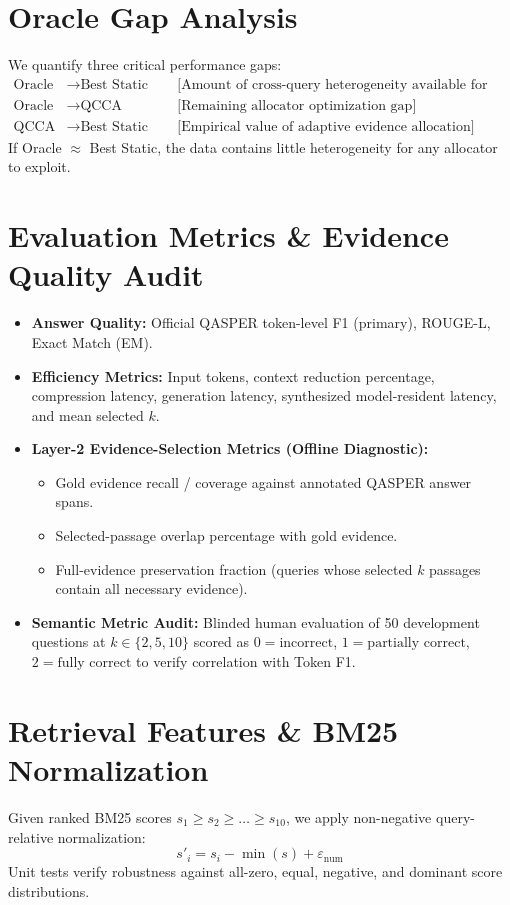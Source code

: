 \documentclass[11pt,a4paper]{article}
\begin{document}
\section{Oracle Gap Analysis}
We quantify three critical performance gaps:
\begin{align*}
\text{Oracle} &\longrightarrow \text{Best Static} \quad &&\text{[Amount of cross-query heterogeneity available for adaptive policies]} \\
\text{Oracle} &\longrightarrow \text{QCCA} \quad &&\text{[Remaining allocator optimization gap]} \\
\text{QCCA} &\longrightarrow \text{Best Static} \quad &&\text{[Empirical value of adaptive evidence allocation]}
\end{align*}
If Oracle $\approx$ Best Static, the data contains little heterogeneity for any allocator to exploit.

\section{Evaluation Metrics \& Evidence Quality Audit}
\begin{itemize}
    \item \textbf{Answer Quality:} Official QASPER token-level F1 (primary), ROUGE-L, Exact Match (EM).
    \item \textbf{Efficiency Metrics:} Input tokens, context reduction percentage, compression latency, generation latency, synthesized model-resident latency, and mean selected $k$.
    \item \textbf{Layer-2 Evidence-Selection Metrics (Offline Diagnostic):}
    \begin{itemize}
        \item Gold evidence recall / coverage against annotated QASPER answer spans.
        \item Selected-passage overlap percentage with gold evidence.
        \item Full-evidence preservation fraction (queries whose selected $k$ passages contain all necessary evidence).
    \end{itemize}
    \item \textbf{Semantic Metric Audit:} Blinded human evaluation of 50 development questions at $k \in \{2, 5, 10\}$ scored as $0 = \text{incorrect}$, $1 = \text{partially correct}$, $2 = \text{fully correct}$ to verify correlation with Token F1.
\end{itemize}

\section{Retrieval Features \& BM25 Normalization}
Given ranked BM25 scores $s_1 \ge s_2 \ge \dots \ge s_{10}$, we apply non-negative query-relative normalization:
\begin{equation}
s'_i = s_i - \min(s) + \varepsilon_{\text{num}}
\end{equation}
Unit tests verify robustness against all-zero, equal, negative, and dominant score distributions.
\end{document}
